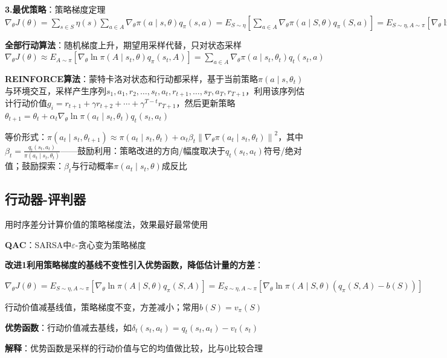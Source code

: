 	\textbf{3.最优策略}：策略梯度定理$\nabla_{\theta} J(\theta)=\sum_{s\in S}\eta(s)\sum_{a\in A}\nabla_{\theta}\pi(a\mid s,\theta) q_{\pi}(s, a)=E_{S\sim\eta}\left[\sum_{a\in A}\nabla_{\theta}\pi(a\mid S,\theta) q_{\pi}(S, a)\right]=E_{S\sim\eta, A\sim\pi}\left[\nabla_{\theta}\ln\pi(A\mid S,\theta) q_{\pi}(S, A)\right]$
	
	\textbf{全部行动算法}：随机梯度上升，期望用采样代替，只对状态采样$\nabla_{\theta} J(\theta)\approx E_{A\sim\pi}\left[\nabla_{\theta}\ln\pi\left(A\mid s_t,\theta\right) q_{\pi}\left(s_t, A\right)\right]=\sum_{a\in A}\nabla_{\theta}\pi\left(a\mid s_t,\theta_t\right) q_t\left(s_t, a\right)$
	
	\textbf{REINFORCE算法}：蒙特卡洛对状态和行动都采样，基于当前策略$\pi\left(a\mid s,\theta_t\right)$与环境交互，采样产生序列$s_1, a_1, r_2,\ldots, s_t, a_t, r_{t+1},\ldots, s_T, a_T, r_{T+1}$，利用该序列估计行动价值$g_i=r_{t+1}+\gamma r_{t+2}+\cdots+\gamma^{T-t} r_{T+1}$，然后更新策略$\theta_{t+1}=\theta_{t}+\alpha_{t}\nabla_{\theta}\ln\pi\left(a_{t}\mid s_{t},\theta_{t}\right) q_{t}\left(s_{t}, a_{t}\right)$
	
	等价形式：$\pi(a_t\mid s_t,\theta_{t+1})\approx\pi(a_t\mid s_t,\theta_t)+\alpha_t\beta_t\left\|\nabla_{\theta}\pi(a_t\mid s_t,\theta_t)\right\|^2$，其中$\beta_t=\frac{q_t\left(s_t, a_t\right)}{\pi\left(a_t\mid s_t,\theta_t\right)}$——鼓励利用：策略改进的方向/幅度取决于$q_t\left(s_t, a_t\right)$符号/绝对值；鼓励探索：$\beta_t$与行动概率$\pi\left(a_t\mid s_t,\theta\right)$成反比
	
	\subsection*{行动器-评判器}
	用时序差分计算价值的策略梯度法，效果最好最常使用
	
	\textbf{QAC}：SARSA中$\varepsilon$-贪心变为策略梯度
	
	\textbf{改进1利用策略梯度的基线不变性引入优势函数，降低估计量的方差}：
	
	$\nabla_{\theta} J(\theta)=E_{S\sim\eta, A\sim\pi}\left[\nabla_{\theta}\ln\pi(A\mid S,\theta) q_{\pi}(S, A)\right]=E_{S\sim\eta, A\sim\pi}\left[\nabla_{\theta}\ln\pi(A\mid S,\theta)\left(q_{\pi}(S, A)-b(S)\right)\right]$
	
	行动价值减基线值，策略梯度不变，方差减小；常用$b(S)=v_{\pi}(S)$
	
	\textbf{优势函数}：行动价值减去基线，如$\delta_t\left(s_t, a_t\right)=q_t\left(s_t, a_t\right)-v_t\left(s_t\right)$
	
	\textbf{解释}：优势函数是采样的行动价值与它的均值做比较，比与0比较合理
	
